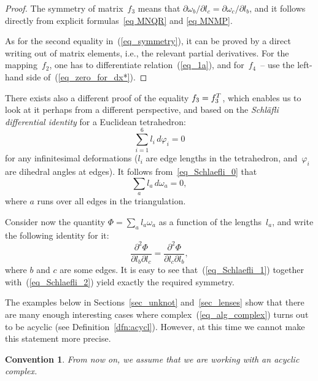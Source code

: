 \documentclass[11pt]{article}
\newtheorem{convention}{Convention}}
\begin{document}
\begin{proof} The symmetry of matrix~$f_3$ means that $\partial \omega_b / \partial l_c = \partial \omega_c / \partial l_b$, and it follows directly from explicit formulas~\eqref{eq MNQR} and \eqref{eq MNMP}.

As for the second equality in~(\ref{eq_symmetry}), it can be proved by a direct writing out of matrix elements, i.e., the relevant partial derivatives. For the mapping~$f_2$, one has to dif\/ferentiate relation~(\ref{eq_1a}), and for~$f_4$~-- use the left-hand side of~(\ref{eq_zero_for_dx*}).
\end{proof}

\begin{remark}
There exists also a dif\/ferent proof of the equality $f_3 = f_3^{\rm T}$, which enables us to look at it perhaps from a dif\/ferent perspective, and based on the \emph{Schl\"afli differential identity} for a Euclidean tetrahedron:
\begin{equation}
\sum_{i=1}^6 l_i \, d\varphi_i = 0
\label{eq_Schlaefli_0}
\end{equation}
for any inf\/initesimal deformations ($l_i$ are edge lengths in the tetrahedron, and~$\varphi_i$ are dihedral angles at edges). It follows from~\eqref{eq_Schlaefli_0} that
\begin{equation}
\sum_a l_a \, d\omega_a = 0,
\label{eq_Schlaefli_1}
\end{equation}
where $a$ runs over all edges in the triangulation.

Consider now the quantity $\Phi=\sum_a l_a \omega_a$ as a function of the lengths~$l_a$, and write the following identity for it:
\begin{equation}
\frac{\partial^2 \Phi}{\partial l_b \partial l_c} = \frac{\partial^2 \Phi}{\partial l_c \partial l_b},
\label{eq_Schlaefli_2}
\end{equation}
where $b$ and $c$ are some edges. It is easy to see that~(\ref{eq_Schlaefli_1}) together with~(\ref{eq_Schlaefli_2}) yield exactly the required symmetry.
\end{remark}

The examples below in Sections~\ref{sec_unknot} and~\ref{sec_lenses} show that there are many enough interesting cases where complex~(\ref{eq_alg_complex}) turns out to be acyclic (see Def\/inition~\ref{dfn:acycl}). However, at this time we cannot make this statement more precise.

\begin{convention}
\label{conv3}
From now on, we assume that we are working with an \emph{acyclic complex}.
\end{convention}
\end{document}
